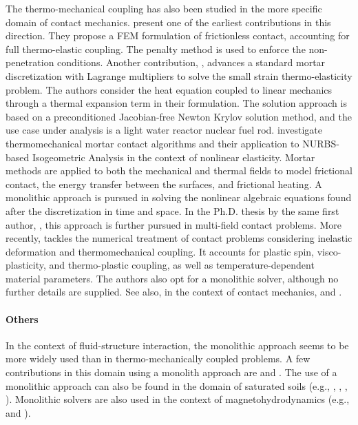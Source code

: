 The thermo-mechanical coupling has also been studied in the more specific domain of contact mechanics.
\cite{zavarise_real_1992} present one of the earliest contributions in this direction.
They propose a FEM formulation of frictionless contact, accounting for full thermo-elastic coupling.
The penalty method is used to enforce the non-penetration conditions.
Another contribution, \cite{hansen_jacobian-free_2011}, advances a standard mortar discretization with Lagrange multipliers to solve the small strain thermo-elasticity problem.
The authors consider the heat equation coupled to linear mechanics through a thermal expansion term in their formulation.
The solution approach is based on a preconditioned Jacobian-free Newton Krylov solution method, and the use case under analysis is a light water reactor nuclear fuel rod.
\cite{dittmann_isogeometric_2014} investigate thermomechanical mortar contact algorithms and their application to NURBS-based Isogeometric Analysis in the context of nonlinear elasticity.
Mortar methods are applied to both the mechanical and thermal fields to model frictional contact, the energy transfer between the surfaces, and frictional heating.
A monolithic approach is pursued in solving the nonlinear algebraic equations found after the discretization in time and space.
In the Ph.D. thesis by the same first author, \cite{dittmann_isogeometric_2017}, this approach is further pursued in multi-field contact problems.
More recently, \cite{seitz_computational_2018, seitz_computational_2019} tackles the numerical treatment of contact problems considering inelastic deformation and thermomechanical coupling.
It accounts for plastic spin, visco-plasticity, and thermo-plastic coupling, as well as temperature-dependent material parameters.
The authors also opt for a monolithic solver, although no further details are supplied.
See also, in the context of contact mechanics, \cite{oancea_finite_1997, pantuso_finite_2000, hueber_thermo-mechanical_2009, hesch_energy-momentum_2011, gitterle_dual_2012} and \cite{novascone_evaluation_2015}.

\paragraph{Others}

In the context of fluid-structure interaction, the monolithic approach seems to be more widely used than in thermo-mechanically coupled problems.
A few contributions in this domain using a monolith approach are \cite{blom_monolithical_1998, heil_efficient_2004, hubner_monolithic_2004, michler_monolithic_2004, zhangStudiesStrongCoupling2004, dettmer_computational_2006, hron_monolithic_2006, tezduyar2006space, kuttler_coupling_2010,gee_truly_2011, kloppel_fluidstructure_2011, mayr_temporal_2015} and \cite{mayr_hybrid_2020}.
The use of a monolithic approach can also be found in the domain of saturated soils (e.g., \cite{lewis_finite_1993}, \cite{borja_elastoplastic_1998}, \cite{jha_locally_2007}, \cite{white_stabilized_2008}).
Monolithic solvers are also used in the context of magnetohydrodynamics (e.g., \cite{SHADID20107649} and \cite{badia_block_2014}).



